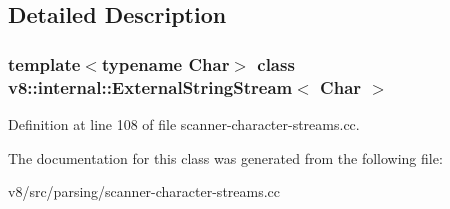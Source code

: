 \subsection{Detailed Description}
\subsubsection*{template$<$typename Char$>$\newline
class v8\+::internal\+::\+External\+String\+Stream$<$ Char $>$}



Definition at line 108 of file scanner-\/character-\/streams.\+cc.



The documentation for this class was generated from the following file\+:\begin{DoxyCompactItemize}
\item 
v8/src/parsing/scanner-\/character-\/streams.\+cc\end{DoxyCompactItemize}
